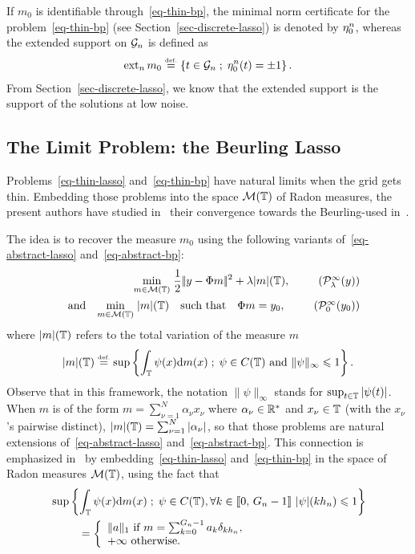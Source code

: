 If $m_0$ is identifiable through~\eqref{eq-thin-bp}, the minimal norm certificate for the problem~\eqref{eq-thin-bp} (see Section~\ref{sec-discrete-lasso}) is denoted by ${\eta_0^n}$, whereas the extended support on $\mathcal{G}_n$ is defined as 
\begin{align}
  \operatorname{ext}_n m_0 \stackrel{\mbox{\upshape\tiny def.}}{=} \left\{ t\in \mathcal{G}_n \;;\; {\eta_0^n}(t)=\pm 1 \right\}.
\end{align}
From Section~\ref{sec-discrete-lasso}, we know that the extended support is the support of the solutions at low noise.


\subsection{The Limit Problem: the Beurling Lasso}
\label{subsec-beurl-lasso}

Problems~\eqref{eq-thin-lasso} and~\eqref{eq-thin-bp} have natural limits when the grid gets thin.
Embedding those problems into the space $\mathcal{M}(\mathbb{T})$ of Radon measures, the present authors have studied in~\cite{2013-duval-sparsespikes} their convergence towards the Beurling-\lasso used in~\cite{deCastro-beurling,Candes-toward,Bredies-space-measures,Tang-linea-spectral}.

The idea is to recover the measure $m_0$ using the following variants of~\eqref{eq-abstract-lasso} and~\eqref{eq-abstract-bp}:
\begin{align}
  \umin{m\in \Mm(\TT)} \frac{1}{2}\norm{y-\Phi m}^2 + \la |m|(\TT), \tag{$\Pp_\la^\infty(y)$}\label{eq-beurl-lasso}\\
 \qandq  \umin{m\in \Mm(\TT)} |m|(\TT) \quad\mbox{such that}\quad \Phi m=y_0,  \tag{$\Pp_0^\infty(y_0)$}\label{eq-beurl-bp}
\end{align}
where $|m|(\mathbb{T})$ refers to the total variation of the measure $m$
\begin{align}
  |m|(\mathbb{T}) \stackrel{\mbox{\upshape\tiny def.}}{=} \sup\left\{ \int_{\mathbb{T}} \psi(x) \mathrm{d} m(x) \;;\; \psi\in C(\mathbb{T})\mbox{ and } \|\psi\|_\infty\leqslant 1 \right\}.
\end{align}
Observe that in this framework, the notation $\|\psi\|_\infty$ stands for $\sup_{t\in\mathbb{T}}|\psi(t)|$.
When $m$ is of the form $m=\sum_{\nu=1}^N \alpha_{\nu}x_{\nu}$ where $\alpha_{\nu}\in\mathbb{R}^*$ and $x_{\nu}\in\mathbb{T}$ (with the $x_{\nu}$'s pairwise distinct), $|m|(\mathbb{T})=\sum_{\nu=1}^N |\alpha_\nu|$, so that those problems are natural extensions of~\eqref{eq-abstract-lasso} and~\eqref{eq-abstract-bp}.
This connection is emphasized in~\cite{2013-duval-sparsespikes} by embedding~\eqref{eq-thin-lasso} and~\eqref{eq-thin-bp} in the space of Radon measures $\mathcal{M}(\mathbb{T})$, using the fact that
\begin{align*}
  &\sup\left\{ \int_{\mathbb{T}} \psi(x) \mathrm{d} m(x) \;;\; \psi\in C(\mathbb{T}), \forall k\in\llbracket 0,\,{G_n}-1 \rrbracket\  |\psi|(k{h_n})\leqslant 1  \right\}\\
  &\hspace*{25pt} = \left\{\begin{array}{ll}
    \|a\|_1 \mbox{ if } m=\sum_{k=0}^{{G_n}-1} a_k \delta_{k{h_n}},\\
    +\infty \mbox{ otherwise.}
  \end{array}\right.
\end{align*}



